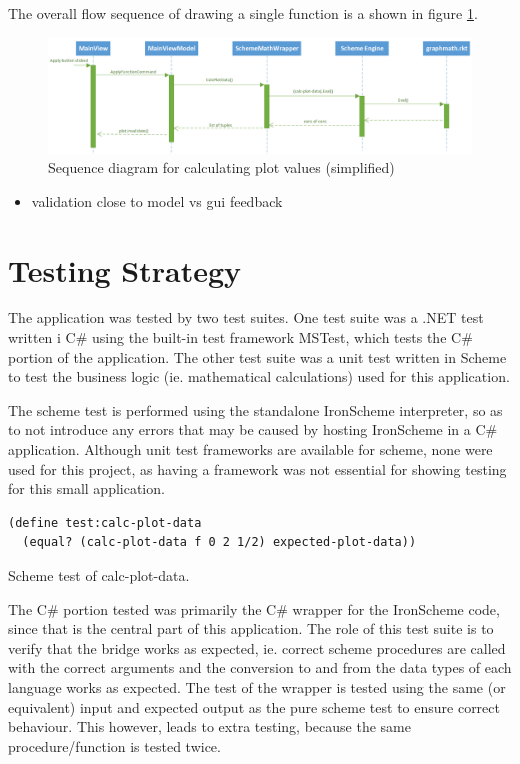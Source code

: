 \documentclass[a4paper,12pt]{article}
\newcommand{\code}[1]{{\fontfamily{pcr}\selectfont #1}}
\begin{document}
The overall flow sequence of drawing a single function is a shown in figure \ref{fig:sequence}.

\begin{figure}[h]
	\centering
	\includegraphics[scale=0.45]{sequence}
	\caption{Sequence diagram for calculating plot values (simplified)}
    \label{fig:sequence}
\end{figure} 



\begin{itemize}
\item validation close to model vs gui feedback
\end{itemize}
		
\section{Testing Strategy}	
The application was tested by two test suites. One test suite was a .NET test written i C\# using the built-in test framework MSTest, which tests the C\# portion of the application. The other test suite was a unit test written in Scheme to test the business logic (ie. mathematical calculations) used for this application. 

The scheme test is performed using the standalone IronScheme interpreter, so as to not introduce any errors that may be caused by hosting IronScheme in a C\# application. 
Although unit test frameworks are available for scheme, none were used for this project, as having a framework was not essential for showing testing for this small application.

\begin{listing}[H]
\begin{verbatim}
(define test:calc-plot-data 
  (equal? (calc-plot-data f 0 2 1/2) expected-plot-data))
\end{verbatim}	

\caption{Scheme test of \code{calc-plot-data}.}
\label{lst:SchemeTest}
\end{listing}

The C\# portion tested was primarily the C\# wrapper for the IronScheme code, since that is the central part of this application. The role of this test suite is to verify that the bridge works as expected, ie. correct scheme procedures are called with the correct arguments and the conversion to and from the data types of each language works as expected. The test of the wrapper is tested using the same (or equivalent) input and expected output as the pure scheme test to ensure correct behaviour. This however, leads to extra testing, because the same procedure/function is tested twice.
\end{document}
